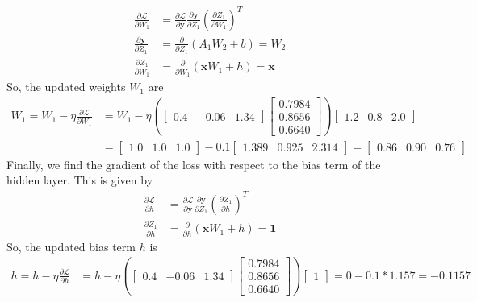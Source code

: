 \documentclass[12pt]{article}
\begin{document}
    \begin{align*}
        \frac{\partial \mathcal{L}}{\partial W_{1}} &= \frac{\partial \mathcal{L}}{\partial \mathbf{y}} \frac{\partial \mathbf{y}}{\partial Z_{1}} \left( \frac{\partial Z_{1}}{\partial W_{1}} \right)^{T} \\
        \frac{\partial \mathbf{y}}{\partial Z_{1}} &= \frac{\partial}{\partial Z_{1}} (A_{1} W_{2} + b) = W_{2} \\
        \frac{\partial Z_{1}}{\partial W_{1}} &= \frac{\partial}{\partial W_{1}} (\mathbf{x} W_{1} + h) = \mathbf{x}
    \end{align*}
    So, the updated weights $W_{1}$ are
    \begin{align*}
        W_{1} = W_{1} - \eta \frac{\partial \mathcal{L}}{\partial W_{1}} &= W_{1} - \eta \left( \begin{bmatrix}
            0.4 & -0.06 & 1.34
        \end{bmatrix} \begin{bmatrix}
            0.7984 \\ 0.8656 \\ 0.6640
        \end{bmatrix} \right) \begin{bmatrix}
            1.2 & 0.8 & 2.0
        \end{bmatrix} \\
        &= \begin{bmatrix}
            1.0 & 1.0 & 1.0
        \end{bmatrix} - 0.1 \begin{bmatrix}
            1.389 & 0.925 & 2.314
        \end{bmatrix} = \begin{bmatrix}
            0.86 & 0.90 & 0.76
        \end{bmatrix}
    \end{align*}
    Finally, we find the gradient of the loss with respect to the bias term of the hidden layer.
    This is given by
    \begin{align*}
        \frac{\partial \mathcal{L}}{\partial h} &= \frac{\partial \mathcal{L}}{\partial \mathbf{y}} \frac{\partial \mathbf{y}}{\partial Z_{1}} \left( \frac{\partial Z_{1}}{\partial h} \right)^{T} \\
        \frac{\partial Z_{1}}{\partial h} &= \frac{\partial}{\partial h} (\mathbf{x} W_{1} + h) = \mathbf{1}
    \end{align*}
    So, the updated bias term $h$ is
    \begin{align*}
        h = h - \eta \frac{\partial \mathcal{L}}{\partial h} &= h - \eta \left( \begin{bmatrix}
            0.4 & -0.06 & 1.34
        \end{bmatrix} \begin{bmatrix}
            0.7984 \\ 0.8656 \\ 0.6640
        \end{bmatrix} \right) \begin{bmatrix}
            1
        \end{bmatrix} = 0 - 0.1 * 1.157 = -0.1157
    \end{align*}
\end{document}
